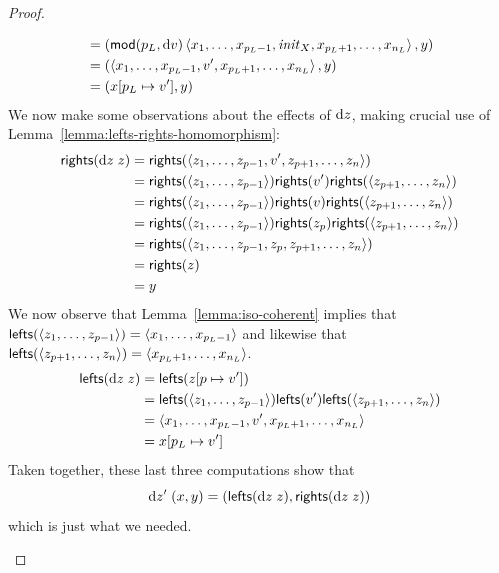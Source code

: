\begin{proof}
{\begin{trivlist}
\begin{align*}
            &= (\mathsf{mod}(p_L,\textrm{d} v)\left< x_1,\ldots, x_{p_L-1},\mathit{init}_X, x_{p_L+1},\ldots, x_{n_L}\right>,y) \\
            &= (\left< x_1,\ldots, x_{p_L-1}, v', x_{p_L+1},\ldots, x_{n_L}\right>,y) \\
            &= (x[p_L\mapsto v'], y)
    \end{align*}
    We now make some observations about the effects of $\textrm{d} z$, making crucial
    use of Lemma~\ref{lemma:lefts-rights-homomorphism}:
    \begin{align*}
        \mathsf{rights}(\textrm{d} z\;z)
            &= \mathsf{rights}(\left< z_1 ,\ldots, z_{p-1} , {v'} , z_{p+1} ,\ldots, z_n \right>) \\
            &= \mathsf{rights}(\left< z_1 ,\ldots, z_{p-1}\right>) \mathsf{rights}({v'}) \mathsf{rights}(\left< z_{p+1} ,\ldots, z_n \right>) \\
            &= \mathsf{rights}(\left< z_1 ,\ldots, z_{p-1}\right>) \mathsf{rights}({v}) \mathsf{rights}(\left< z_{p+1} ,\ldots, z_n \right>) \\
            &= \mathsf{rights}(\left< z_1 ,\ldots, z_{p-1}\right>) \mathsf{rights}(z_p) \mathsf{rights}(\left< z_{p+1} ,\ldots, z_n \right>) \\
            &= \mathsf{rights}(\left< z_1 ,\ldots, z_{p-1} , z_p , z_{p+1} ,\ldots, z_n \right>) \\
            &= \mathsf{rights}(z) \\
            &= y
    \end{align*}
    We now observe that Lemma~\ref{lemma:iso-coherent} implies that
    $\mathsf{lefts}(\left< z_1 ,\ldots, z_{p-1} \right>)=\left< x_1 ,\ldots,
    x_{p_L-1} \right>$ and likewise that $\mathsf{lefts}(\left< z_{p+1} ,\ldots,
    z_n \right>)=\left< x_{p_L+1} ,\ldots, x_{n_L} \right>$.
    \begin{align*}
        \mathsf{lefts}(\textrm{d} z\;z)
            &= \mathsf{lefts}(z[p \mapsto {v'}]) \\
            &= \mathsf{lefts}(\left< z_1 ,\ldots, z_{p-1} \right>)\mathsf{lefts}({v'})\mathsf{lefts}(\left< z_{p+1} ,\ldots, z_n \right>) \\
            &= \left< x_1,\ldots, x_{p_L-1}, v', x_{p_L+1},\ldots, x_{n_L}\right> \\
            &= x[p_L\mapsto v']
    \end{align*}
    Taken together, these last three computations show that
    \[\textrm{d} z'\;(x,y) = (\mathsf{lefts}(\textrm{d} z\;z),\mathsf{rights}(\textrm{d} z\;z))\]
    which is just what we needed.


\end{trivlist}}
\end{proof}
